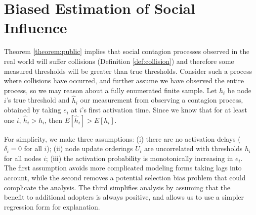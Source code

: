 \documentclass[a4paper]{article}
\begin{document}
\begin{comment}
It is easy to check that any asynchronous updating order will also produce at least one incorrectly measured node in the absence of activation delays plus private signals. For instance, the update order $C = (\{left\}, \{top\}, \{bottom\}, \{right\})$ will incorrectly measure the thresholds of $bottom$ and $right$.

\end{comment}

\section{Biased Estimation of Social Influence}

\begin{comment}
Assume for simplicity: no activation delays, update ordering is not correlated with threshold

Then we know: E[x | y] is biased upward, since E[x | y = 1] is biased upward and E[x | y = 0] is not biased

We have 2 cases:
1) estimating a probability of adoption at each threshold
2) estimating a marginal effect, a beta coefficient, of the utility of adopting neighbors

Consider the CEF E[y | x], at each x, this will just give the probability that an individual is active in the sample

We can write beta as E^-1[x * x] E[x * y] = sum xy / sum xx

\end{comment}

Theorem \ref{theorem:public} implies that social contagion processes observed in the real world will suffer collisions (Definition \ref{def:collision}) and therefore some measured thresholds will be greater than true thresholds. Consider such a process where collisions have occurred, and further assume we have observed the entire process, so we may reason about a fully enumerated finite sample. Let $h_i$ be node $i$'s true threshold and $\hat{h}_i$ our measurement from observing a contagion process, obtained by taking $e_i$ at $i$'s first activation time. Since we know that for at least one $i$, $\hat{h}_i > h_i$, then $E[\hat{h}_i] > E[h_i]$.

For simplicity, we make three assumptions: (i) there are no activation delays ($\delta_i = 0$ for all $i$); (ii) node update orderings $U_i$ are uncorrelated with thresholds $h_i$ for all nodes $i$; (iii) the activation probability is monotonically increasing in $e_i$. The first assumption avoids more complicated modeling forms taking lags into account, while the second removes a potential selection bias problem that could complicate the analysis. The third simplifies analysis by assuming that the benefit to additional adopters is always positive, and allows us to use a simpler regression form for explanation.
\end{document}
